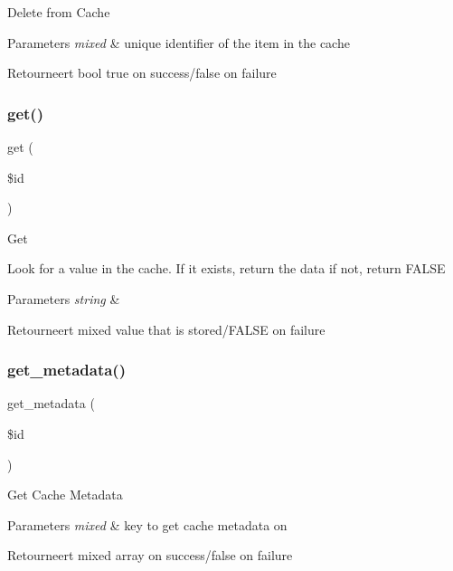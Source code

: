 Delete from Cache


\begin{DoxyParams}{Parameters}
{\em mixed} & unique identifier of the item in the cache \\
\hline
\end{DoxyParams}
\begin{DoxyReturn}{Retourneert}
bool true on success/false on failure 
\end{DoxyReturn}
\mbox{\label{class_c_i___cache__apc_a50e3bfb586b2f42932a6a93f3fbb0828}} 
\subsubsection{\texorpdfstring{get()}{get()}}
{\footnotesize\ttfamily get (\begin{DoxyParamCaption}\item[{}]{\$id }\end{DoxyParamCaption})}

Get

Look for a value in the cache. If it exists, return the data if not, return F\+A\+L\+SE


\begin{DoxyParams}{Parameters}
{\em string} & \\
\hline
\end{DoxyParams}
\begin{DoxyReturn}{Retourneert}
mixed value that is stored/\+F\+A\+L\+SE on failure 
\end{DoxyReturn}
\mbox{\label{class_c_i___cache__apc_a59635cf18e997c5141bffa05ff7622e0}} 
\subsubsection{\texorpdfstring{get\_metadata()}{get\_metadata()}}
{\footnotesize\ttfamily get\+\_\+metadata (\begin{DoxyParamCaption}\item[{}]{\$id }\end{DoxyParamCaption})}

Get Cache Metadata


\begin{DoxyParams}{Parameters}
{\em mixed} & key to get cache metadata on \\
\hline
\end{DoxyParams}
\begin{DoxyReturn}{Retourneert}
mixed array on success/false on failure 
\end{DoxyReturn}
\mbox{\label{class_c_i___cache__apc_a2f07a4e09b57f4460d49852497d1808f}} 
